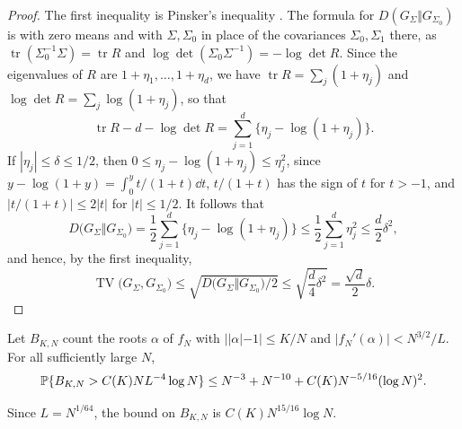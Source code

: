 \begin{proof}
The first inequality is Pinsker's inequality
\cite[Lemma~2.5(i)]{Tsybakov2009}. The formula for
$D(G_\Sigma\Vert G_{\Sigma_0})$ is \cite[eq.~(A.23)]{RasmussenWilliams2006}
with zero means and with $\Sigma,\Sigma_0$ in place of the covariances
$\Sigma_0,\Sigma_1$ there, as $\operatorname{tr}(\Sigma_0^{-1}\Sigma)=\operatorname{tr}R$ and
$\log\det(\Sigma_0\Sigma^{-1})=-\log\det R$.
Since the eigenvalues of $R$ are $1+\eta_1,\ldots,1+\eta_d$, we have
$\operatorname{tr}R=\sum_j(1+\eta_j)$ and
$\log\det R=\sum_j\log(1+\eta_j)$, so that
\[
 \operatorname{tr}R-d-\log\det R=\sum_{j=1}^d\{\eta_j-\log(1+\eta_j)\}.
\]
If $|\eta_j|\le\delta\le1/2$, then
$0\le\eta_j-\log(1+\eta_j)\le\eta_j^2$,
since $y-\log(1+y)=\int_0^y t/(1+t)\dd t$, $t/(1+t)$ has the sign of $t$
for $t>-1$, and $|t/(1+t)|\le2|t|$ for $|t|\le1/2$.
It follows that
\[
 D\bigl(G_\Sigma\Vert G_{\Sigma_0}\bigr)
 =\frac12\sum_{j=1}^d\{\eta_j-\log(1+\eta_j)\}
 \le\frac12\sum_{j=1}^d\eta_j^2
 \le\frac d2\delta^2,
\]
and hence, by the first inequality,
\[
 \operatorname{TV}\bigl(G_\Sigma,G_{\Sigma_0}\bigr)
 \le\sqrt{D\bigl(G_\Sigma\Vert G_{\Sigma_0}\bigr)/2}
 \le\sqrt{\frac d4\delta^2}
 =\frac{\sqrt d}{2}\delta.
\]
\end{proof}

\begin{lemma}\label{lem:small-derivatives}
Let $B_{K,N}$ count the roots $\alpha$ of $f_N$ with $||\alpha|-1|\le K/N$
and $|f_N'(\alpha)|<N^{3/2}/L$. For all sufficiently large $N$,
\[
 \mathbb P\{B_{K,N}>C(K)NL^{-4}\log N\}
 \le N^{-3}+N^{-10}+C(K)N^{-5/16}(\log N)^2.
\]
\end{lemma}

Since $L=N^{1/64}$, the bound on $B_{K,N}$ is $C(K)N^{15/16}\log N$.

